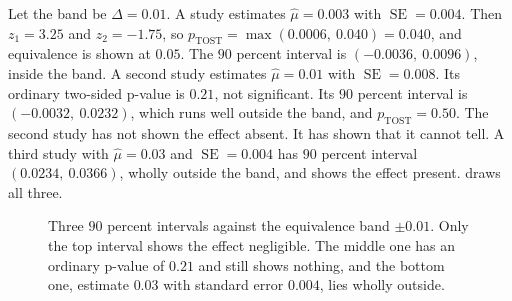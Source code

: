 \begin{example}\label{ex:ch09:tost}
Let the band be $\Delta=0.01$. A study estimates $\hat\mu=0.003$ with $\operatorname{SE}=0.004$. Then $z_1=3.25$ and $z_2=-1.75$, so $p_{\text{TOST}}=\max(0.0006,\ 0.040)=0.040$, and equivalence is shown at $0.05$. The $90$ percent interval is $(-0.0036,\ 0.0096)$, inside the band. A second study estimates $\hat\mu=0.01$ with $\operatorname{SE}=0.008$. Its ordinary two-sided p-value is $0.21$, not significant. Its $90$ percent interval is $(-0.0032,\ 0.0232)$, which runs well outside the band, and $p_{\text{TOST}}=0.50$. The second study has not shown the effect absent. It has shown that it cannot tell. A third study with $\hat\mu=0.03$ and $\operatorname{SE}=0.004$ has $90$ percent interval $(0.0234,\ 0.0366)$, wholly outside the band, and shows the effect present.  draws all three.
\end{example}

\begin{figure}[tbp]
\centering
{}
\caption{Three $90$ percent intervals against the equivalence band $\pm0.01$. Only the top interval shows the effect negligible. The middle one has an ordinary p-value of $0.21$ and still shows nothing, and the bottom one, estimate $0.03$ with standard error $0.004$, lies wholly outside.}
\label{fig:ch09:tost}
\end{figure}

